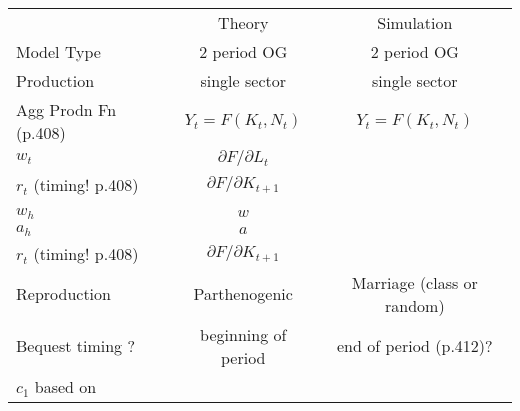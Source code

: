 \documentclass{article}
\begin{document}
\begin{table}[htp]
\caption{}
\label{t:differences}
\centering
\begin{tabular}{lcc}\toprule
                        & Theory                        & Simulation
\\
Model Type              & 2 period OG                   & 2 period OG
\\
Production              & single sector                 & single sector
\\ 
Agg Prodn Fn (p.408)    & $Y_{t}=F(K_{t},N_{t})$        & $Y_{t}=F(K_{t},N_{t})$
\\ 
$w_{t}$                 & $\partial F/\partial L_{t}$   &
\\
$r_{t}$ (timing! p.408) & $\partial F/\partial K_{t+1}$ &
\\
\\ 
$w_{h}$                 & $w$                           &
\\ 
$a_{h}$                 & $a$                           &
\\
$r_{t}$ (timing! p.408) & $\partial F/\partial K_{t+1}$ &
\\
Reproduction            & Parthenogenic                 & Marriage (class or random)
\\
Bequest timing ?        & beginning of period           & end of period (p.412)?
\\
$c_{1}$ based on           &                               &
\\
\bottomrule
\end{tabular}
\end{table}


  
  
\end{document}

